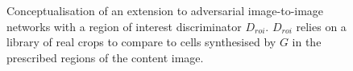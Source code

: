 \begin{figure}[]
\caption{Conceptualisation of an extension to adversarial image-to-image networks with a region of interest discriminator $D_{roi}$. $D_{roi}$ relies on a library of real crops to compare to cells synthesised by $G$ in the prescribed regions of the content image.}
\label{fig:roi_gan}
\end{figure}

